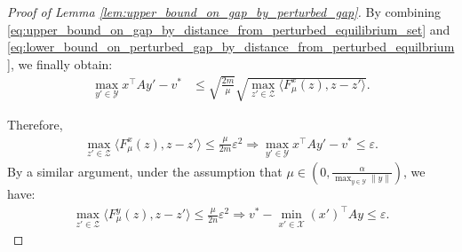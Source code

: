 \documentclass{article}
\newcommand{\X}{\mathcal{X}}
\newcommand{\Y}{\mathcal{Y}}
\newcommand{\Z}{\mathcal{Z}}
\theoremstyle{plain}
\begin{document}
\begin{proof}[Proof of Lemma \ref{lem:upper_bound_on_gap_by_perturbed_gap}]
    By combining \eqref{eq:upper_bound_on_gap_by_distance_from_perturbed_equilibrium_set} and \eqref{eq:lower_bound_on_perturbed_gap_by_distance_from_perturbed_equilbrium}, we finally obtain:
    \begin{align*}
        \max_{y'\in \Y}x^{\top}Ay' - v^{\ast} & \leq \sqrt{\frac{2m}{\mu}} \sqrt{\max_{z'\in \Z}\langle F_{\mu}^x(z), z - z'\rangle}.
    \end{align*}

    Therefore,
    \begin{align*}
        \max_{z'\in \Z}\langle F_{\mu}^x(z), z - z'\rangle \leq \frac{\mu}{2m}\varepsilon^2 \Rightarrow \max_{y'\in \Y}x^{\top}Ay' - v^{\ast}\leq \varepsilon.
    \end{align*}
    By a similar argument, under the assumption that $\mu \in (0, \frac{\alpha}{\max_{y\in \Y}\|y\|})$, we have:
    \begin{align*}
        \max_{z'\in \Z}\langle F_{\mu}^y(z), z - z'\rangle \leq \frac{\mu}{2n}\varepsilon^2 \Rightarrow v^{\ast} - \min_{x'\in \X}(x')^{\top}Ay\leq \varepsilon.
    \end{align*}
\end{proof}
\end{document}
